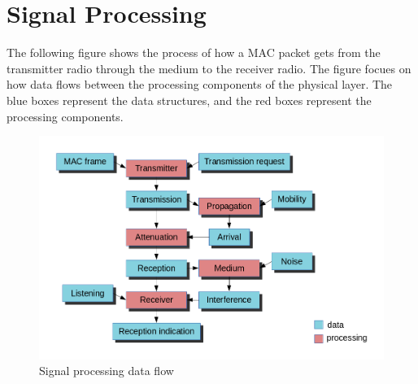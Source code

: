 \section{Signal Processing}

The following figure shows the process of how a MAC packet gets from the
transmitter radio through the medium to the receiver radio. The figure focues on
how data flows between the processing components of the physical layer. The blue
boxes represent the data structures, and the red boxes represent the processing
components.

\begin{figure}[h!]
\centering
\includegraphics[width=\textwidth]{figures/phydataflow}
\caption{Signal processing data flow}
\end{figure}

